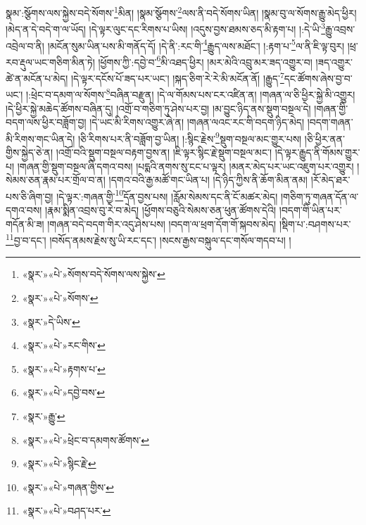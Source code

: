 སྣམ་:སྩོགས་ལས་སྐྱེས་བདེ་སོགས་\footnote{«སྣར་»«པེ་»སོགས་བདེ་སོགས་ལས་སྐྱེས་}མིན། །སྣམ་སྩོགས་\footnote{«སྣར་»«པེ་»སོགས་}ལས་ནི་བདེ་སོགས་ཡིན། །སྣམ་བུ་ལ་སོགས་རྒྱུ་མེད་ཕྱིར། །མེད་ན་དེ་བདེ་ག་ལ་ཡོད། །དེ་ལྟར་ལུང་དང་རིགས་པ་ཡིས། །འདུས་བྱས་ཐམས་ཅད་མི་རྟག་པ། །:དེ་ཡི་\footnote{«སྣར་»དེ་ཡིས་}རྒྱུ་འབྲས་འབྲེལ་བ་ནི། །མངོན་སུམ་ཡིན་པས་མི་གནོད་དོ། །དེ་ནི་:རང་གི་\footnote{«སྣར་»«པེ་»རང་གིས་}རྒྱུད་ལས་མཐོང་། །:རྟག་པ་\footnote{«སྣར་»«པེ་»རྟགས་པ་}ལ་ནི་ཇི་ལྟ་བུར། །ཕྲ་རབ་རྡུལ་ཡང་གཅིག་མིན་ཏེ། །ཕྱོགས་ཀྱི་:དབྱེ་བ་\footnote{«སྣར་»«པེ་»དབྱེ་བས་}མི་འཐད་ཕྱིར། །མར་མེའི་འབྲུ་མར་ཟད་འགྱུར་བ། །ཟད་འགྱུར་ཚེ་ན་མངོན་པ་མེད། །དེ་ལྟར་དངོས་པོ་ཟད་པར་ཡང་། །སྐད་ཅིག་རེ་རེ་མི་མངོན་ནོ། །རྒྱུད་\footnote{«སྣར་»རྒྱུ་}དང་ཚོགས་ཞེས་བྱ་བ་ཡང་། །:ཕྲེང་བ་དམག་ལ་སོགས་\footnote{«སྣར་»«པེ་»ཕྲེང་བ་དམགས་ཚོགས་}བཞིན་བརྫུན། །དེ་ལ་གོམས་པས་ངར་འཛིན་ན། །གཞན་ལ་ཅི་ཕྱིར་སྐྱེ་མི་འགྱུར། །དེ་ཕྱིར་སྐྱེ་མཆེད་ཚོགས་བཞིན་དུ། །འགྲོ་བ་གཅིག་ཏུ་ཤེས་པར་བྱ། །མ་བྱུང་ཉིད་ནས་སྡུག་བསྔལ་དེ། །གཞན་གྱི་བདག་ལས་ཕྱིར་བཟློག་བྱ། །དེ་ཡང་མི་རིགས་འགྱུར་ཞེ་ན། །གཞན་ལའང་རང་གི་བདག་ཉིད་མེད། །བདག་གཞན་མི་རིགས་གང་ཡིན་དེ། །ཅི་རིགས་པར་ནི་བཟློག་བྱ་ཡིན། །:སྙིང་རྗེས་\footnote{«སྣར་»«པེ་»སྙིང་རྗེ་}སྡུག་བསྔལ་མང་གྱུར་པས། །ཅི་ཕྱིར་ནན་གྱིས་སྐྱེད་ཅེ་ན། །འགྲོ་བའི་སྡུག་བསྔལ་བརྟག་བྱས་ན། །ཇི་ལྟར་སྙིང་རྗེ་སྡུག་བསྔལ་མང་། །དེ་ལྟར་རྒྱུད་ནི་གོམས་གྱུར་པ། །གཞན་གྱི་སྡུག་བསྔལ་ཞི་དགའ་བས། །པདྨའི་ནགས་སུ་ངང་པ་ལྟར། །མནར་མེད་པར་ཡང་འཇུག་པར་འགྱུར། །སེམས་ཅན་རྣམ་པར་གྲོལ་བ་ན། །དགའ་བའི་རྒྱ་མཚོ་གང་ཡིན་པ། །དེ་ཉིད་ཀྱིས་ནི་ཆོག་མིན་ནམ། །རོ་མེད་ཐར་པས་ཅི་ཞིག་བྱ། །དེ་ལྟར་:གཞན་གྱི་\footnote{«སྣར་»«པེ་»གཞན་གྱིས་}དོན་བྱས་པས། །རློམ་སེམས་དང་ནི་ངོ་མཚར་མེད། །གཅིག་ཏུ་གཞན་དོན་ལ་དགའ་བས། །རྣམ་སྨིན་འབྲས་བུ་རེ་བ་མེད། །ཕྱོགས་བཅུའི་སེམས་ཅན་ཕུན་ཚོགས་དེའི། །བདག་གི་ཡིན་པར་གདོན་མི་ཟ། །གཞན་བདེ་བདག་གིར་འདུ་ཤེས་པས། །བདག་ལ་ཕྲག་དོག་གོ་སྐབས་མེད། །སྡིག་པ་:བཤགས་པར་\footnote{«སྣར་»«པེ་»བཤད་པར་}བྱ་བ་དང་། །བསོད་ནམས་རྗེས་སུ་ཡི་རང་དང་། །སངས་རྒྱས་བསྐུལ་དང་གསོལ་གདབ་པ། །
